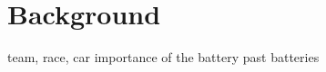 \chapter{Background}\label{ch:background}

team, race, car
importance of the battery 
past batteries

